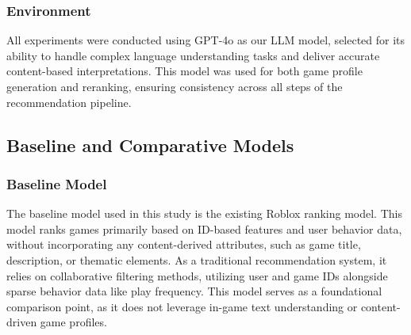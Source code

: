 \subsubsection{Environment}
All experiments were conducted using GPT-4o as our LLM model, selected for its ability to handle complex language understanding tasks and deliver accurate content-based interpretations. This model was used for both game profile generation and reranking, ensuring consistency across all steps of the recommendation pipeline.

\subsection{Baseline and Comparative Models}

\subsubsection{Baseline Model}
The baseline model used in this study is the existing Roblox ranking model. This model ranks games primarily based on ID-based features and user behavior data, without incorporating any content-derived attributes, such as game title, description, or thematic elements. As a traditional recommendation system, it relies on collaborative filtering methods, utilizing user and game IDs alongside sparse behavior data like play frequency. This model serves as a foundational comparison point, as it does not leverage in-game text understanding or content-driven game profiles.

